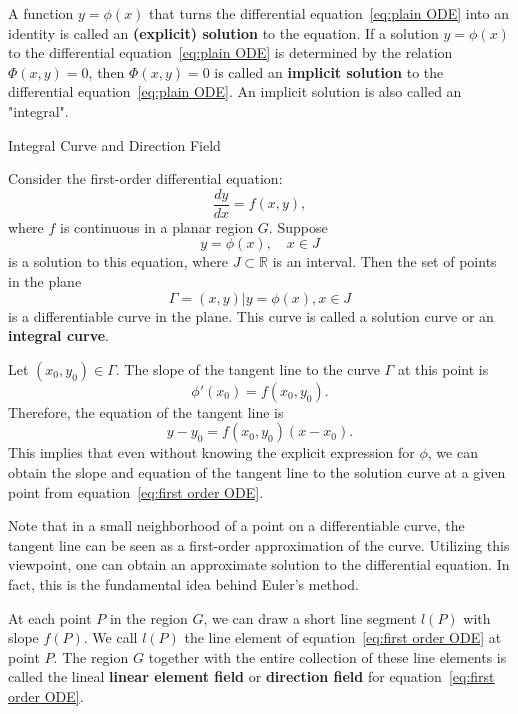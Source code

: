 \documentclass[11pt]{elegantbook}
\begin{document}
A function $y = \phi(x)$ that turns the differential equation~\eqref{eq:plain ODE} into an identity is called an 
\textbf{(explicit) solution} to the equation. 
If a solution $y = \phi(x)$ to the differential equation~\eqref{eq:plain ODE} is determined 
by the relation $\Phi(x, y) = 0$, then $\Phi(x, y) = 0$ is called an \textbf{implicit solution} to the differential equation~\eqref{eq:plain ODE}. 
An implicit solution is also called an "integral". 

\begin{leftbarTitle}{Integral Curve and Direction Field}\end{leftbarTitle}
Consider the first-order differential equation:
\begin{equation}\label{eq:first order ODE}
    \frac{dy}{dx} = f(x,y),
\end{equation}
where $f$ is continuous in a planar region $G$. 
Suppose 
\[
y = \phi(x), \quad x \in J
\] 
is a solution to this equation, where $J \subset \mathbb{R}$ is an interval. 
Then the set of points in the plane 
\[
\Gamma = { (x,y) | y = \phi(x), x \in J }
\]
is a differentiable curve in the plane. 
This curve is called a solution curve or an \textbf{integral curve}.

Let $(x_0, y_0) \in \Gamma$. 
The slope of the tangent line to the curve $\Gamma$ at this point is 
\[
\phi'(x_{0}) = f(x_{0}, y_{0}).
\]
Therefore, the equation of the tangent line is 
\[
    y - y_0 = f(x_0, y_0)(x - x_0).
\]
This implies that even without knowing the explicit expression for $\phi$, 
we can obtain the slope and equation of the tangent line to the solution curve 
at a given point from equation~\eqref{eq:first order ODE}. 

\begin{remark}
    Note that in a small neighborhood of a point on a differentiable curve, 
    the tangent line can be seen as a first-order approximation of the curve. 
    Utilizing this viewpoint, one can obtain an approximate solution to the differential equation. 
    In fact, this is the fundamental idea behind Euler's method.
\end{remark}

At each point $P$ in the region $G$, 
we can draw a short line segment $l(P)$ with slope $f(P)$. 
We call $l(P)$ the line element of equation~\eqref{eq:first order ODE} at point $P$. 
The region $G$ together with the entire collection of these line elements is called 
the lineal \textbf{linear element field} or \textbf{direction field} for equation~\eqref{eq:first order ODE}.
\end{document}
